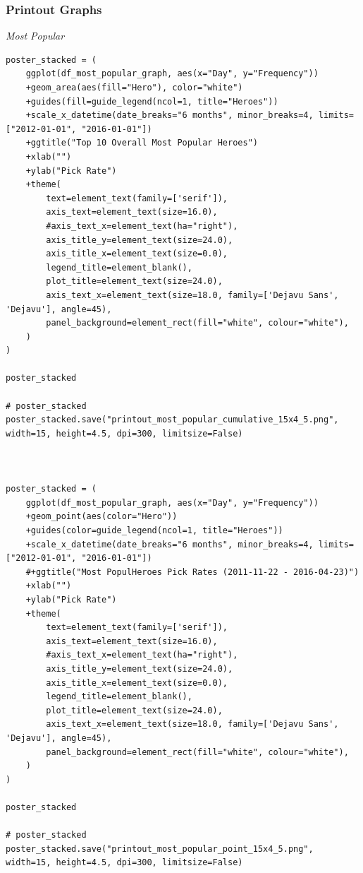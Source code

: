 \subsubsection*{Printout Graphs}

\emph{Most Popular}
\begin{verbatim}
poster_stacked = (
    ggplot(df_most_popular_graph, aes(x="Day", y="Frequency"))
    +geom_area(aes(fill="Hero"), color="white")
    +guides(fill=guide_legend(ncol=1, title="Heroes"))
    +scale_x_datetime(date_breaks="6 months", minor_breaks=4, limits=["2012-01-01", "2016-01-01"])
    +ggtitle("Top 10 Overall Most Popular Heroes")
    +xlab("")
    +ylab("Pick Rate")
    +theme(
        text=element_text(family=['serif']),
        axis_text=element_text(size=16.0),
        #axis_text_x=element_text(ha="right"),
        axis_title_y=element_text(size=24.0),
        axis_title_x=element_text(size=0.0),
        legend_title=element_blank(),
        plot_title=element_text(size=24.0),
        axis_text_x=element_text(size=18.0, family=['Dejavu Sans', 'Dejavu'], angle=45),
        panel_background=element_rect(fill="white", colour="white"),
    )
)

poster_stacked

# poster_stacked
poster_stacked.save("printout_most_popular_cumulative_15x4_5.png", width=15, height=4.5, dpi=300, limitsize=False)



poster_stacked = (
    ggplot(df_most_popular_graph, aes(x="Day", y="Frequency"))
    +geom_point(aes(color="Hero"))
    +guides(color=guide_legend(ncol=1, title="Heroes"))
    +scale_x_datetime(date_breaks="6 months", minor_breaks=4, limits=["2012-01-01", "2016-01-01"])
    #+ggtitle("Most PopulHeroes Pick Rates (2011-11-22 - 2016-04-23)")
    +xlab("")
    +ylab("Pick Rate")
    +theme(
        text=element_text(family=['serif']),
        axis_text=element_text(size=16.0),
        #axis_text_x=element_text(ha="right"),
        axis_title_y=element_text(size=24.0),
        axis_title_x=element_text(size=0.0),
        legend_title=element_blank(),
        plot_title=element_text(size=24.0),
        axis_text_x=element_text(size=18.0, family=['Dejavu Sans', 'Dejavu'], angle=45),
        panel_background=element_rect(fill="white", colour="white"),
    )
)

poster_stacked

# poster_stacked
poster_stacked.save("printout_most_popular_point_15x4_5.png", width=15, height=4.5, dpi=300, limitsize=False)
\end{verbatim}

